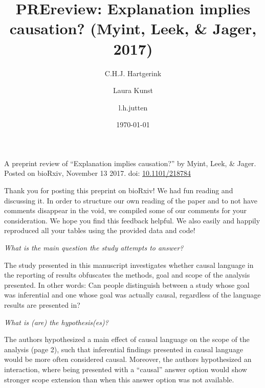 \documentclass[10pt]{article}
\renewenvironment{abstract}
  {{\bfseries\noindent{\abstractname}\par\nobreak}\footnotesize}
  {\bigskip}
\begin{document}
\title{PREreview: Explanation implies causation? (Myint, Leek, \& Jager, 2017)}



\author[1]{C.H.J. Hartgerink}%
\author[2]{Laura Kunst}%
\author[2]{l.h.jutten}%
%
%


\vspace{-1em}



  \date{\today}


\begingroup
\let\center\flushleft
\let\endcenter\endflushleft
\maketitle
\endgroup





\begin{abstract}
A preprint review of ``Explanation implies causation?'' by Myint, Leek,
\& Jager. Posted on bioRxiv, November 13 2017. doi:
\href{http://doi.org/10.1101/218784}{10.1101/218784}%
\end{abstract}%




Thank you for posting this preprint on bioRxiv! We had fun reading and
discussing it. In order to structure our own reading of the paper and to
not have comments disappear in the void, we compiled some of our
comments for your consideration. We hope you find this feedback helpful.
We also easily and happily reproduced all your tables using the provided
data and code!

\emph{What is the main question the study attempts to answer?}

The study presented in this manuscript investigates whether causal
language in the reporting of results obfuscates the methods, goal and
scope of the analysis presented. In other words: Can people distinguish
between a study whose goal was inferential and one whose goal was
actually causal, regardless of the language results are presented in?

\emph{What is (are) the hypothesis(es)?}

The authors hypothesized a main effect of causal language on the scope
of the analysis (page 2), such that inferential findings presented in
causal language would be more often considered causal. Moreover, the
authors hypothesized an interaction, where being presented with a
``causal'' answer option would show stronger scope extension than when
this answer option was not available.
\end{document}
